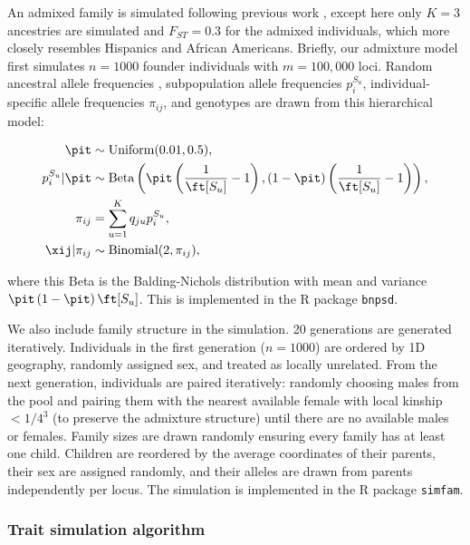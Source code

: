 \documentclass[11pt]{article}
\begin{document}
\begin{linenumbers}
An admixed family is simulated following previous work \citep{yao_limitations_2022}, except here only $K=3$ ancestries are simulated and $F_{ST}=0.3$ for the admixed individuals, which more closely resembles Hispanics and African Americans.
Briefly, our admixture model first simulates $n=1000$ founder individuals with $m=100,000$ loci.
Random ancestral allele frequencies \pit, subpopulation allele frequencies $p_i^{S_u}$, individual-specific allele frequencies $\pi_{ij}$, and genotypes \xij are drawn from this hierarchical model:
\begin{linenomath*}
\begin{align*}
  \pit
  &\sim
    \text{Uniform}( 0.01, 0.5 )
    , \\
  p_i^{S_u} | \pit
  &\sim
    \text{Beta} \left(
    \pit \left( \frac{1}{ \ft[S_u] } - 1 \right),
    \left( 1 - \pit \right) \left( \frac{1}{ \ft[S_u] } - 1 \right)
    \right)
    , \\
  \pi_{ij}
  &=
    \sum_{u = 1}^K q_{ju} p_i^{S_u}
    , \\
  \xij | \pi_{ij}
  &\sim
    \text{Binomial}(2, \pi_{ij})
    ,
\end{align*}
\end{linenomath*}
where this Beta is the Balding-Nichols distribution \citep{balding_method_1995} with mean \pit and variance $\pit \left( 1 - \pit \right) \ft[S_u]$.
This is implemented in the R package \texttt{bnpsd}.

We also include family structure in the simulation.
20 generations are generated iteratively.
Individuals in the first generation ($n=1000$) are ordered by 1D geography, randomly assigned sex, and treated as locally unrelated. 
From the next generation, individuals are paired iteratively: randomly choosing males from the pool and pairing them with the nearest available female with local kinship $<1/4^3$ (to preserve the admixture structure) until there are no available males or females.
Family sizes are drawn randomly ensuring every family has at least one child.
Children are reordered by the average coordinates of their parents, their sex are assigned randomly, and their alleles are drawn from parents independently per locus.
The simulation is implemented in the R package \texttt{simfam}.

\subsubsection{Trait simulation algorithm}


\end{linenumbers}
\end{document}
